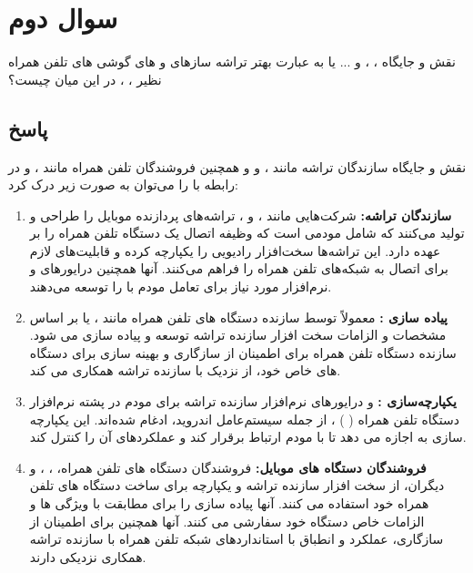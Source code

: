 \documentclass[landscape, 12pt]{report}
\begin{document}
   
            
\section*{سوال دوم}
نقش و جایگاه
 ، 
 ،
  و ... یا به عبارت بهتر تراشه سازهای
   و
   های گوشی های تلفن همراه نظیر
    ،
     ،
       در این میان چیست؟

\subsection*{پاسخ}
نقش و جایگاه سازندگان تراشه مانند
، 
و
 و همچنین فروشندگان تلفن همراه مانند
 ،
 و
  در رابطه با 
   را می‌توان به صورت زیر درک کرد:
\begin{enumerate}
	\item 
		\textbf{سازندگان تراشه:} 
		شرکت‌هایی مانند 
		، 
		و
		، تراشه‌های پردازنده موبایل را طراحی و تولید می‌کنند که شامل مودمی است که وظیفه اتصال 
		 یک دستگاه تلفن همراه را بر عهده دارد. این تراشه‌ها سخت‌افزار رادیویی را یکپارچه کرده و قابلیت‌های لازم برای اتصال به شبکه‌های تلفن همراه را فراهم می‌کنند. آنها همچنین درایورهای 
		  و نرم‌افزار مورد نیاز برای تعامل مودم با
		    را توسعه می‌دهند.
	\item 
	\textbf{پیاده سازی
	 :}
	 معمولاً توسط سازنده دستگاه های تلفن همراه مانند 
	 ،
	 یا
	  بر اساس مشخصات و الزامات سخت افزار سازنده تراشه توسعه و پیاده سازی می شود. سازنده دستگاه تلفن همراه برای اطمینان از سازگاری و بهینه سازی 
	   برای دستگاه های خاص خود، از نزدیک با سازنده تراشه همکاری می کند.
	   
	   \item 
	   \textbf{یکپارچه‌سازی
	    :}
	     و درایورهای نرم‌افزار سازنده تراشه برای مودم در پشته نرم‌افزار دستگاه تلفن همراه
	     (
	     )
	     ، از جمله سیستم‌عامل اندروید، ادغام شده‌اند. این یکپارچه سازی به 
	      اجازه می دهد تا با مودم ارتباط برقرار کند و عملکردهای آن را کنترل کند.
\item 
\textbf{فروشندگان دستگاه های موبایل:} 
فروشندگان دستگاه های تلفن همراه، 
،
،
 و دیگران، از سخت افزار سازنده تراشه و 
  یکپارچه برای ساخت دستگاه های تلفن همراه خود استفاده می کنند. آنها پیاده سازی
    را برای مطابقت با ویژگی ها و الزامات خاص دستگاه خود سفارشی می کنند. آنها همچنین برای اطمینان از سازگاری، عملکرد و انطباق با استانداردهای شبکه تلفن همراه با سازنده تراشه همکاری نزدیکی دارند.
\end{enumerate}
\end{document}
